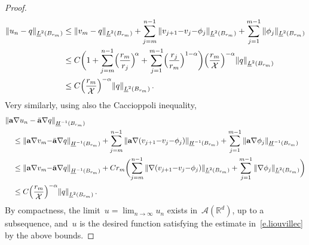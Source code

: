 \documentclass[11pt,twoside]{article} %
\numberwithin{equation}{section}
\theoremstyle{definition}
\let\originalleft\left
\let\originalright\right
\renewcommand{\left}{\mathopen{}\mathclose\bgroup\originalleft}
\renewcommand{\right}{\aftergroup\egroup\originalright}
\newcommand*{\R}{\ensuremath{\mathbb{R}}}
\renewcommand{\a}{\mathbf{a}}
\newcommand{\ahom}{\bar{\a}}
\newcommand{\X}{\mathcal{X}}
\begin{document}
\begin{proof}
\begin{align*}  
\| u_n - q \|_{\underline{L}^2(B_{r_m})}  
& \leq 
\| v_m - q \|_{\underline{L}^2(B_{r_m})} 
+ \sum_{j=m}^{n-1}  \| v_{j+1} {-} v_j {-} \phi_j \|_{\underline{L}^2(B_{r_m})}
+ \sum_{j=1}^{m-1}\| \phi_j \|_{\underline{L}^2(B_{r_m})}
\notag \\ &
\leq 
C\biggl(1+ \sum_{j=m}^{n-1} \Bigl( \frac{r_m}{r_j}\Bigr)^{\! \alpha} +  \sum_{j=1}^{m-1} \Bigl( \frac{r_j}{r_m} \Bigr)^{1-\alpha}    \biggr)  \Bigl( \frac{r_m}{\X} \Bigr)^{-\alpha}   \left\| q \right\|_{\underline{L}^2(B_{r_m})}
\notag \\ &
\leq
C \Bigl( \frac{r_m}{\X} \Bigr)^{-\alpha}   \left\| q \right\|_{\underline{L}^2(B_{r_m})}
\,.
\end{align*}
Very similarly, using also the Caccioppoli inequality, 
\begin{align}  
\lefteqn{
\left\|  \a \nabla u_n - \ahom \nabla q \right\|_{\underline{H}^{-1}(B_{r_m})} 
} \quad &
\notag \\ & 
\leq
\left\|  \a \nabla v_m {-} \ahom \nabla q \right\|_{\underline{H}^{-1}(B_{r_m})} 
 + \sum_{j=m}^{n-1}  \| \a \nabla (v_{j+1} {-} v_j {-} \phi_j) \|_{\underline{H}^{-1}(B_{r_m})} 
+  \sum_{j=1}^{m-1 } \| \a \nabla \phi_j \|_{\underline{H}^{-1}(B_{r_m})} 
\notag \\ & 
\leq
\left\|  \a \nabla v_m {-} \ahom \nabla q \right\|_{\underline{H}^{-1}(B_{r_m})} 
 + C r_m\biggl( \sum_{j=m}^{n-1}   \|\nabla (v_{j+1} {-} v_j {-} \phi_j) \|_{\underline{L}^2(B_{r_m})}
+  \sum_{j=1}^{m-1 }  \| \nabla \phi_j \|_{\underline{L}^2(B_{r_m})} \biggr)
\notag \\ & 
\leq 
C \Bigl( \frac{r_m}{\X} \Bigr)^{-\alpha}   \left\| q \right\|_{\underline{L}^2(B_{r_m})}
\,.
\end{align}
By compactness, the limit~$u = \lim_{n \to \infty} u_n$ exists in~$\mathcal{A}(\R^d)$, up to a subsequence,  and~$u$ is the desired function satisfying the estimate in~\eqref{e.liouvillec} by the above bounds. 

\smallskip


\end{proof}
\end{document}
